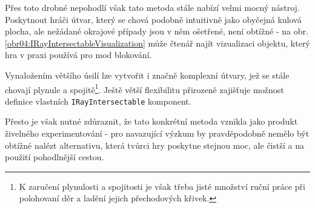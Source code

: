 Přes toto drobné nepohodlí však tato metoda stále nabízí velmi mocný nástroj. Poskytnout hráči útvar, který se chová podobně intuitivně jako obyčejná kulová plocha, ale nežádané okrajové případy jsou v něm ošetřené, není obtížné - na obr.\ref{obr04:IRayIntersectableVisualization} může čtenář najít vizualizaci objektu, který hra v praxi používá pro mod blokování. 


Vynaložením většího úsilí lze vytvořit i značně komplexní útvary, jež se stále chovají plynule a spojitě\footnote{K zaručení plynulosti a spojitosti je však třeba jisté množství ruční práce při polohovaní děr a ladění jejich přechodových křivek.}. Ještě větší flexibilitu přirozeně zajišťuje možnost definice vlastních \texttt{IRayIntersectable} komponent. 

Přesto je však nutné zdůraznit, že tato konkrétní metoda vznikla jako produkt živelného experimentování - pro navazující výzkum by pravděpodobně nemělo být obtížné nalézt alternativu, která tvůrci hry poskytne stejnou moc, ale čistší a na použití pohodlnější cestou. 

